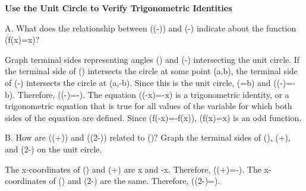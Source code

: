 \documentclass{article}
\newenvironment{example}[1]{}{}         %
\newcommand{\answer}[1]{}               %
\newcommand{\placeholder}[2]{}          %
\newcommand{\te}[1]{}                   %
\begin{document}
\begin{example}{1}
\textbf{Use the Unit Circle to Verify Trigonometric Identities}
\te{CONCEPTUAL UNDERSTANDING. Powered by Desmos.}
A. What does the relationship between (\sin(-\theta)) and (-\sin\theta) indicate about the function (f(x)=\sin x)?
\placeholder{graph}{Black unit circle on double-arrowed x,y axes, grid .25, window [-1.5,1.5] by [-1.25,1.25]; x,y labels -1,-.5,.5,1. Blue radius to filled point (a,b) in quadrant I and red radius to (a,-b) quadrant IV; blue counterclockwise theta arc and red clockwise -theta arc from positive x axis.}
\te{Callout: The coordinate (a,b) may represent any point on the unit circle. Therefore, this justification holds true for any angle, theta.}
Graph terminal sides representing angles (\theta) and (-\theta) intersecting the unit circle.
If the terminal side of (\theta) intersects the circle at some point (a,b), the terminal side of (-\theta) intersects the circle at (a,-b). Since this is the unit circle, (\sin\theta=b) and (\sin(-\theta)=-b). Therefore, (\sin(-\theta)=-\sin\theta).
The equation (\sin(-x)=-\sin x) is a trigonometric identity, or a trigonometric equation that is true for all values of the variable for which both sides of the equation are defined.
Since (f(-x)=-f(x)), (f(x)=\sin x) is an odd function.
\te{REASON Think about how transformations of the graph of (y=\sin x) can be used to show the equivalence of (\sin(-x)) and (-\sin x). CONTINUED ON THE NEXT PAGE.}
\answer{A. (\sin(-\theta)=-\sin\theta); (f(x)=\sin x) is an odd function.}
B. How are (\cos(\theta+\pi)) and (\cos(2\pi-\theta)) related to (\cos\theta)?
Graph the terminal sides of (\theta), (\theta+\pi), and (2\pi-\theta) on the unit circle.
\placeholder{graph}{Black unit circle, double-arrowed x,y axes with O origin and labels -1,1; grid .25, window [-1.25,1.25] each axis. Blue radius to quadrant I filled point (x,y), red radius opposite to quadrant III point (-x,-y), green radius to quadrant IV point (x,-y). Arcs from positive x axis labeled blue theta, red theta+pi counterclockwise, green 2pi-theta counterclockwise nearly full turn.}
The x-coordinates of (\theta) and (\theta+\pi) are x and -x. Therefore, (\cos(\theta+\pi)=-\cos\theta).
The x-coordinates of (\theta) and (2\pi-\theta) are the same. Therefore, (\cos(2\pi-\theta)=\cos\theta).
\te{LEARN TOGETHER What are ways to stay positive and work toward goals?}
\answer{B. (\cos(\theta+\pi)=-\cos\theta); (\cos(2\pi-\theta)=\cos\theta).}
\end{example}
\end{document}
